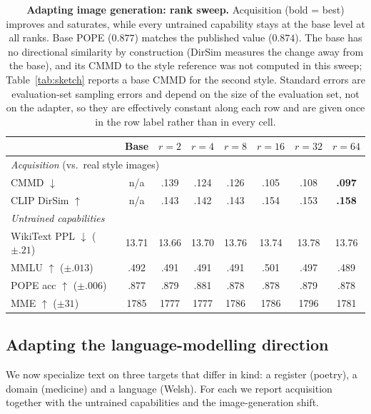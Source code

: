 \documentclass{article}
\begin{document}
\begin{table}[t]
\caption{\textbf{Adapting image generation: rank sweep.} Acquisition (bold =
best) improves and saturates, while every untrained capability stays at the base
level at all ranks. Base POPE ($0.877$) matches the published value ($0.874$).
The base has no directional similarity by construction (DirSim measures the
change away from the base), and its CMMD to the style reference was not computed
in this sweep; Table~\ref{tab:sketch} reports a base CMMD for the second style.
Standard errors are evaluation-set sampling errors and depend on the size of the
evaluation set, not on the adapter, so they are effectively constant along each
row and are given once in the row label rather than in every cell.}
\label{tab:rank}
\centering\small
\begin{tabular}{lccccccc}
\toprule
& Base & $r{=}2$ & $r{=}4$ & $r{=}8$ & $r{=}16$ & $r{=}32$ & $r{=}64$ \\
\midrule
\multicolumn{8}{l}{\emph{Acquisition} (vs.\ real style images)}\\
CMMD $\downarrow$        & n/a & .139 & .124 & .126 & .105 & .108 & \textbf{.097} \\
CLIP DirSim $\uparrow$   & n/a & .143 & .142 & .143 & .154 & .153 & \textbf{.158} \\
\midrule
\multicolumn{8}{l}{\emph{Untrained capabilities}}\\
WikiText PPL $\downarrow$ \tiny($\pm.21$) & 13.71 & 13.66 & 13.70 & 13.76 & 13.74 & 13.78 & 13.76 \\
MMLU $\uparrow$ \tiny($\pm.013$)          & .492 & .491 & .491 & .491 & .501 & .497 & .489 \\
POPE acc $\uparrow$ \tiny($\pm.006$)      & .877 & .879 & .881 & .878 & .878 & .879 & .878 \\
MME $\uparrow$ \tiny($\pm31$)             & 1785 & 1777 & 1777 & 1786 & 1786 & 1796 & 1781 \\
\bottomrule
\end{tabular}
\end{table}

\subsection{Adapting the language-modelling direction}
\label{sec:text}
We now specialize text on three targets that differ in kind: a register
(poetry), a domain (medicine) and a language (Welsh). For each we report
acquisition together with the untrained capabilities and the image-generation
shift.
\end{document}
